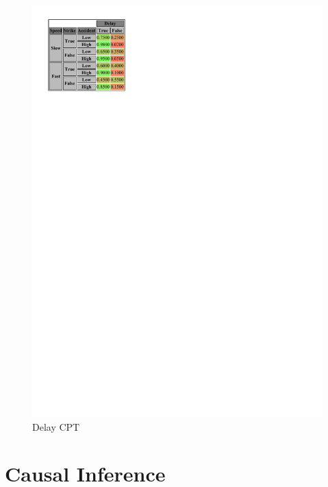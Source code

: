 \documentclass[a4paper,12pt]{article} %
\begin{document}
\begin{figure}[H]
\begin{center}
\begin{minipage}[c]{.45\textwidth}
		\includegraphics[width=.9\linewidth]{../code/delay.pdf}	
		\caption*{Delay CPT}
		\label{fig:delay}
	\end{minipage}

\end{center}
\end{figure}

\section{Causal Inference}
\end{document}
